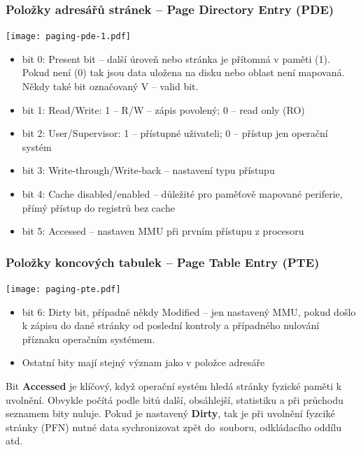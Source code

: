 \documentclass{beamer}
\begin{document}
\begin{frame}
\frametitle{Položky adresářů stránek -- \textbf{Page Directory Entry} (PDE) }

{
\centering

\texttt{[image: paging-pde-1.pdf]}

}

\vskip 2mm

\begin{itemize}
\item bit 0: Present bit -- další úroveň nebo stránka je přítomná v paměti (1). Pokud není (0) tak jsou data uložena na disku nebo oblast není mapovaná. Někdy také bit označovaný V -- valid bit.
\item bit 1: Read/Write: 1 -- R/W -- zápis povolený; 0 -- read only (RO)
\item bit 2: User/Supervisor: 1 -- přístupné uživateli; 0 -- přístup jen operační systém
\item bit 3: Write-through/Write-back -- nastavení typu přístupu
\item bit 4: Cache disabled/enabled -- důležité pro paměťově mapované periferie, přímý přístup do registrů bez cache
\item bit 5: Accessed -- nastaven MMU při prvním přístupu z procesoru
\end{itemize}

\end{frame}

\begin{frame}
\frametitle{Položky koncových tabulek -- \textbf{Page Table Entry} (PTE)}

{
\centering

\texttt{[image: paging-pte.pdf]}

}

\vskip 2mm

\begin{itemize}
\item bit 6: Dirty bit, případně někdy Modified – jen nastavený MMU, pokud došlo k zápisu do dané stránky od poslední kontroly a případného nulování příznaku operačním systémem.
\item Ostatní bity mají stejný význam jako v položce adresáře
\end{itemize}

Bit \textbf{Accessed} je klíčový, když operační systém hledá stránky fyzické paměti k uvolnění.
Obvykle počítá podle bitů další, obsáhlejší, statistiku a při průchodu seznamem bity nuluje.
Pokud je nastavený \textbf{Dirty}, tak je při uvolnění fyzciké stránky (PFN) nutné data
sychronizovat zpět do~souboru, odkládacího oddílu atd.

\end{frame}
\end{document}
